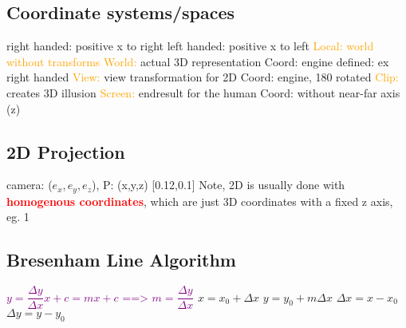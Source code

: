 \documentclass[main.tex,fontsize=12pt,paper=a4,paper=landscape,DIV=calc,]{scrartcl}
\begin{document}
\begin{multicols*}{4}
\subsection{Coordinate systems/spaces}
right handed: positive x to right\newline
left handed: positive x to left\newline
\textcolor{orange}{Local: world without transforms}\newline
\textcolor{orange}{World:} actual 3D representation \newline
Coord: engine defined: ex right handed\newline 
\textcolor{orange}{View:} view transformation for 2D \newline
Coord: engine, 180 rotated\newline
\textcolor{orange}{Clip:} creates 3D illusion\newline
\textcolor{orange}{Screen:} endresult for the human\newline
Coord: without near-far axis (z)

\subsection{2D Projection}
camera: (\(e_x, e_y, e_z\)), P: (x,y,z)\newline
{}[0.12,0.1]\newline
Note, 2D is usually done with \textcolor{red}{\textbf{homogenous coordinates}}, which are just 3D coordinates with a fixed z axis, eg. 1

\subsection{Bresenham Line Algorithm}
\textcolor{purple}{\(y = \dfrac{\Delta y}{\Delta x}x + c = mx + c\) ==> \(m = \dfrac{\Delta y}{\Delta x}\)}\newline
\(x = x_0 + \Delta x\) \(y = y_0 + m\Delta x\) \newline \(\Delta x = x - x_0\) \(\Delta y = y - y_0 \)


\end{multicols*}
\end{document}
